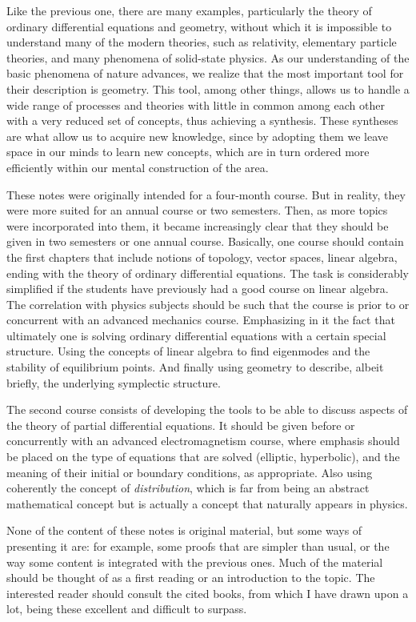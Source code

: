 Like the previous one, there are many examples, particularly the theory of ordinary differential equations and geometry, without which it is impossible to understand many of the modern theories, such as relativity, elementary particle theories, and many phenomena of solid-state physics. As our understanding of the basic phenomena of nature advances, we realize that the most important tool for their description is geometry. This tool, among other things, allows us to handle a wide range of processes and theories with little in common among each other with a very reduced set of concepts, thus achieving a synthesis. These syntheses are what allow us to acquire new knowledge, since by adopting them we leave space in our minds to learn new concepts, which are in turn ordered more efficiently within our mental construction of the area.

These notes were originally intended for a four-month course. But in reality, they were more suited for an annual course or two semesters. Then, as more topics were incorporated into them, it became increasingly clear that they should be given in two semesters or one annual course. Basically, one course should contain the first chapters that include notions of topology, vector spaces, linear algebra, ending with the theory of ordinary differential equations. The task is considerably simplified if the students have previously had a good course on linear algebra. The correlation with physics subjects should be such that the course is prior to or concurrent with an advanced mechanics course. Emphasizing in it the fact that ultimately one is solving ordinary differential equations with a certain special structure. Using the concepts of linear algebra to find eigenmodes and the stability of equilibrium points. And finally using geometry to describe, albeit briefly, the underlying symplectic structure.

The second course consists of developing the tools to be able to discuss aspects of the theory of partial differential equations. It should be given before or concurrently with an advanced electromagnetism course, where emphasis should be placed on the type of equations that are solved (elliptic, hyperbolic), and the meaning of their initial or boundary conditions, as appropriate. Also using coherently the concept of \textit{distribution}, which is far from being an abstract mathematical concept but is actually a concept that naturally appears in physics.

None of the content of these notes is original material, but some ways of presenting it are: for example, some proofs that are simpler than usual, or the way some content is integrated with the previous ones. Much of the material should be thought of as a first reading or an introduction to the topic. The interested reader should consult the cited books, from which I have drawn upon a lot, being these excellent and difficult to surpass.
